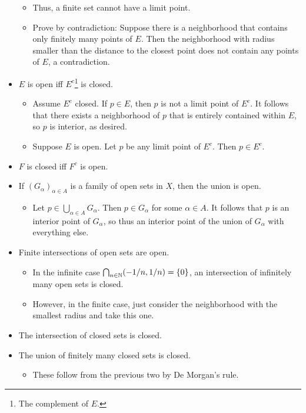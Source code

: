 \documentclass[../../notes.tex]{subfiles}
\begin{document}
\begin{itemize}
    \begin{itemize}
        \item Thus, a finite set cannot have a limit point.
        \item Prove by contradiction: Suppose there is a neighborhood that contains only finitely many points of $E$. Then the neighborhood with radius smaller than the distance to the closest point does not contain any points of $E$, a contradiction.
    \end{itemize}
    \item $E$ is open iff $E^c$\footnote{The complement of $E$.} is closed.
    \begin{itemize}
        \item Assume $E^c$ closed. If $p\in E$, then $p$ is not a limit point of $E^c$. It follows that there exists a neighborhood of $p$ that is entirely contained within $E$, so $p$ is interior, as desired.
        \item Suppose $E$ is open. Let $p$ be any limit point of $E^c$. Then $p\in E^c$.
    \end{itemize}
    \item $F$ is closed iff $F^c$ is open.
    \item If $(G_\alpha)_{\alpha\in A}$ is a family of open sets in $X$, then the union is open.
    \begin{itemize}
        \item Let $p\in\bigcup_{\alpha\in A}G_\alpha$. Then $p\in G_\alpha$ for some $\alpha\in A$. It follows that $p$ is an interior point of $G_\alpha$, so thus an interior point of the union of $G_\alpha$ with everything else.
    \end{itemize}
    \item Finite intersections of open sets are open.
    \begin{itemize}
        \item In the infinite case $\bigcap_{n\in\mathbb{N}}(-1/n,1/n)=\{0\}$, an intersection of infinitely many open sets is closed.
        \item However, in the finite case, just consider the neighborhood with the smallest radius and take this one.
    \end{itemize}
    \item The intersection of closed sets is closed.
    \item The union of finitely many closed sets is closed.
    \begin{itemize}
        \item These follow from the previous two by De Morgan's rule.

\end{itemize}
\end{itemize}
\end{document}

